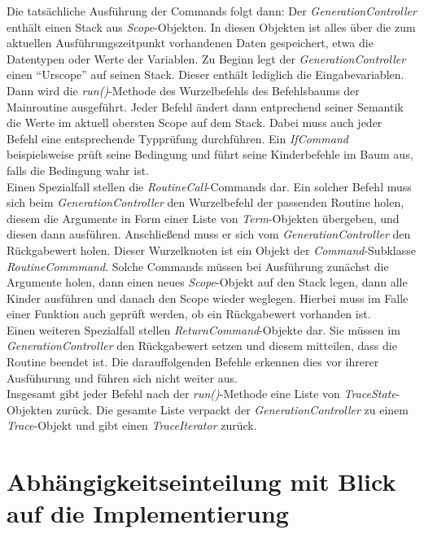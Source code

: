 \documentclass[parskip=full]{scrartcl}
\begin{document}
Die tatsächliche Ausführung der Commands folgt dann: Der \textit{GenerationController} enthält einen Stack aus \textit{Scope}-Objekten. In diesen Objekten ist alles über die zum aktuellen Ausführungszeitpunkt vorhandenen Daten gespeichert, etwa die Datentypen oder Werte der Variablen. Zu Beginn legt der \textit{GenerationController} einen \enquote{Urscope} auf seinen Stack. Dieser enthält lediglich die Eingabevariablen. Dann wird die \textit{run()}-Methode des Wurzelbefehls des Befehlsbaums der Mainroutine ausgeführt. Jeder Befehl ändert dann entprechend seiner Semantik die Werte im aktuell obersten Scope auf dem Stack. Dabei muss auch jeder Befehl eine entsprechende Typprüfung durchführen. Ein \textit{IfCommand} beispielsweise prüft seine Bedingung und führt seine Kinderbefehle im Baum aus, falls die Bedingung wahr ist. \\
Einen Spezialfall stellen die \textit{RoutineCall}-Commands dar. Ein solcher Befehl muss sich beim \textit{GenerationController} den Wurzelbefehl der passenden Routine holen, diesem die Argumente in Form einer Liste von \textit{Term}-Objekten übergeben, und diesen dann ausführen. Anschließend muss er sich vom \textit{GenerationController} den Rückgabewert holen. Dieser Wurzelknoten ist ein Objekt der \textit{Command}-Subklasse \textit{RoutineCommmand}. Solche Commands müssen bei Ausführung zunächst die Argumente holen, dann einen neues \textit{Scope}-Objekt auf den Stack legen, dann alle Kinder ausführen und danach den Scope wieder weglegen. Hierbei muss im Falle einer Funktion auch geprüft werden, ob ein Rückgabewert vorhanden ist.\\
Einen weiteren Spezialfall stellen \textit{ReturnCommand}-Objekte dar. Sie müssen im \textit{GenerationController} den Rückgabewert setzen und diesem mitteilen, dass die Routine beendet ist. Die darauffolgenden Befehle erkennen dies vor ihrerer Ausfühurung und führen sich nicht weiter aus. \\
Insgesamt gibt jeder Befehl nach der \textit{run()}-Methode eine Liste von  \textit{TraceState}-Objekten zurück. Die gesamte Liste verpackt der \textit{GenerationController} zu einem \textit{Trace}-Objekt und gibt einen \textit{TraceIterator} zurück.
\section{Abhängigkeitseinteilung mit Blick auf die Implementierung}
\end{document}
